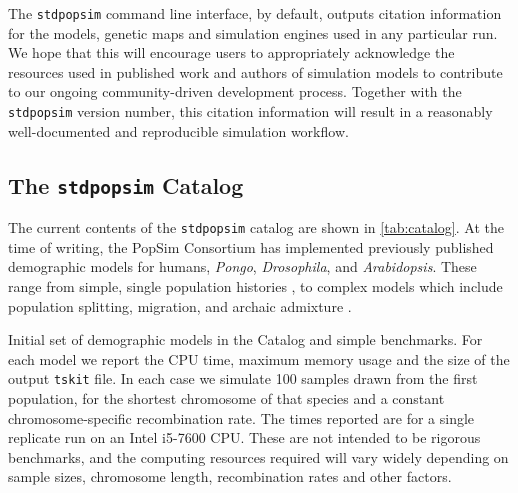 \documentclass[12pt,halfline,a4paper]{ouparticle}
\newcommand{\stdpopsim}{\texttt{stdpopsim}\xspace}
\newcommand{\tskit}{\texttt{tskit}\xspace}
\begin{document}
The \stdpopsim command line interface, by default, outputs citation information
for the models, genetic maps and simulation engines used in any particular run.
We hope that this will encourage users to appropriately acknowledge the
resources used in published work and authors
of simulation models to contribute to our ongoing community-driven development process.
Together with the \stdpopsim version number, this citation information will result in a reasonably well-documented and reproducible simulation workflow.

\subsection*{The \stdpopsim Catalog}
The current contents of the \stdpopsim catalog are shown in \autoref{tab:catalog}. At the time of
writing, the PopSim Consortium has implemented previously published demographic models for
humans, \emph{Pongo}, \emph{Drosophila}, and \emph{Arabidopsis}.
These range from
simple, single population histories \cite[e.g.,][]{sheehan2016deep},
to complex models which include population splitting, migration, and archaic
admixture \cite[e.g.,][]{ragsdale2019models}.

\renewcommand{\arraystretch}{1.2}
\begin{table}[t]
\makebox[\textwidth][c]{
    \begin{footnotesize}
    
    \end{footnotesize}
}
\caption{\label{tab:catalog}
Initial set of demographic models in the Catalog and simple benchmarks.
For each model we report the CPU time, maximum memory usage and the
size of the output \tskit file. In each case we simulate 100 samples
drawn from the first population, for the shortest chromosome of that species
and a constant chromosome-specific recombination rate.
The times reported are for a single replicate run on an Intel i5-7600 CPU.
These are not intended to be rigorous benchmarks, and the computing resources
required will vary widely depending on sample sizes, chromosome length,
recombination rates and other factors.
}
\end{table}
\end{document}
